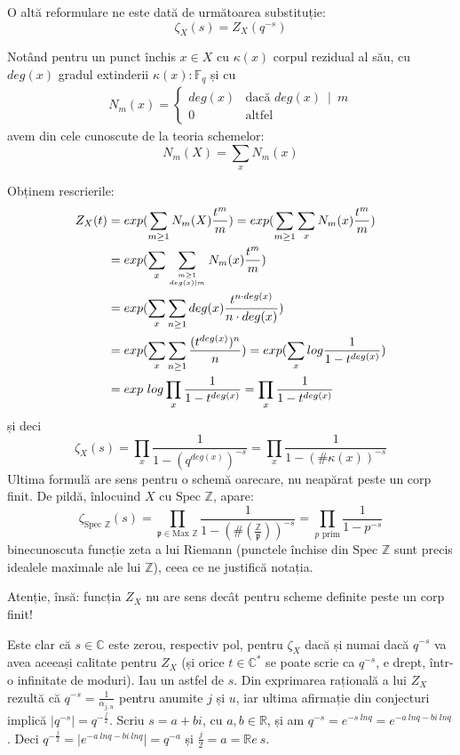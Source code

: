 \documentclass[13pt,openany]{book}
\begin{document}
O altă reformulare ne este dată de următoarea substituție:
$$\zeta_X(s)=Z_X(q^{-s})$$

Notând pentru un punct închis $x \in X$ cu $\kappa(x)$ corpul rezidual al său, cu $deg(x)$ gradul extinderii $\kappa(x) : \mathbb{F}_q$ și cu
\begin{align*}
N_m(x) = \left\{
     \begin{array}{lr}
       deg(x) & \text{dacă } deg(x)\ \mid \ m\\
       0 & \text{altfel}
     \end{array}
   \right.
\end{align*}
avem din cele cunoscute de la teoria schemelor:
$$N_m(X)=\sum\limits_x N_m(x)$$

Obținem rescrierile:
\begin{align*}
Z_X(t)&=exp(\sum_{m\geq 1} N_m(X) \frac{t^m}{m}) = exp(\sum_{m\geq 1} \sum\limits_x N_m(x) \frac{t^m}{m})\\
&=exp(\sum_x \sum_{m \geq 1 \atop deg(x) \mid  m} N_m(x) \frac{t^m}{m})\\
&=exp(\sum_x \sum_{n \geq 1} deg(x) \frac{t^{n\cdot deg(x)}}{n \cdot deg(x)})\\
&=exp(\sum_x \sum_{n\geq 1} \frac{(t^{deg(x)})^n}{n})=exp(\sum_x log \frac{1}{1-t^{deg(x)}})\\
&=exp\ log \prod_x \frac{1}{1-t^{deg(x)}} = \prod_x \frac{1}{1-t^{deg(x)}}
\end{align*}
și deci
$$\zeta_X(s)=\prod_x \frac{1}{1-(q^{deg(x)})^{-s}} = \prod_x \frac{1}{1-(\#\kappa(x))^{-s}}$$
Ultima formulă are sens pentru o schemă oarecare, nu neapărat peste un corp finit. De pildă, înlocuind $X$ cu $\text{Spec }\mathbb{Z}$, apare:
$$\zeta_{\text{Spec }\mathbb{Z}}(s)=\prod_{\mathfrak{p} \in \text{Max }\mathbb{Z}} \frac{1}{1-(\#(\frac{\mathbb{Z}}{\mathfrak{p}}))^{-s}} = \prod_{p\text{ prim}} \frac{1}{1-p^{-s}}$$
binecunoscuta funcție zeta a lui Riemann (punctele închise din $\text{Spec }\mathbb{Z}$ sunt precis idealele maximale ale lui $\mathbb{Z}$), ceea ce ne justifică notația.

Atenție, însă: funcția $Z_X$ nu are sens decât pentru scheme definite peste un corp finit!

Este clar că $s\in\mathbb{C}$ este zerou, respectiv pol, pentru $\zeta_X$ dacă și numai dacă $q^{-s}$ va avea aceeași calitate pentru $Z_X$ (și orice $t \in \mathbb{C}^*$ se poate scrie ca $q^{-s}$, e drept, într-o infinitate de moduri). Iau un astfel de $s$. Din exprimarea rațională a lui $Z_X$ rezultă că $q^{-s}=\frac{1}{\alpha_{j,u}}$ pentru anumite $j$ și $u$, iar ultima afirmație din conjecturi implică $\mid q^{-s}\mid =q^{-\frac{j}{2}}$. Scriu $s=a+bi$, cu $a,b\in\mathbb{R}$, și am $q^{-s}=e^{-s\ ln q} = e^{-a\ ln q- bi\ ln q}$. Deci $q^{-\frac{j}{2}}=\mid e^{-a\ ln q- bi\ ln q}\mid =q^{-a}$ și $\frac{j}{2}=a=\mathbb{R}e\ s$.
\end{document}
